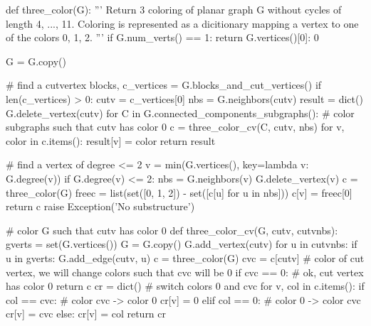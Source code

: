\begin{sageCell}
    def three_color(G):
    '''
    Return 3 coloring of planar graph G without cycles of length 4, ..., 11.
    Coloring is represented as a dicitionary mapping a vertex to one of the colors 0, 1, 2.
    '''
    if G.num_verts() == 1:
        return {G.vertices()[0]: 0}

    G = G.copy()

    # find a cutvertex
    blocks, c_vertices = G.blocks_and_cut_vertices()
    if len(c_vertices) > 0:
        cutv = c_vertices[0]
        nbs = G.neighbors(cutv)
        result = dict()
        G.delete_vertex(cutv)
        for C in G.connected_components_subgraphs():
            # color subgraphs such that cutv has color 0
            c = three_color_cv(C, cutv, nbs)
            for v, color in c.items():
                result[v] = color
        return result

    # find a vertex of degree <= 2
    v = min(G.vertices(), key=lambda v: G.degree(v))
    if G.degree(v) <= 2:
        nbs = G.neighbors(v)
        G.delete_vertex(v)
        c = three_color(G)
        freec = list(set([0, 1, 2]) - set([c[u] for u in nbs]))
        c[v] = freec[0]
        return c
    raise Exception('No substructure')

# color G such that cutv has color 0
def three_color_cv(G, cutv, cutvnbs):
    gverts = set(G.vertices())
    G = G.copy()
    G.add_vertex(cutv)
    for u in cutvnbs:
        if u in gverts:
            G.add_edge(cutv, u)
    c = three_color(G)
    cvc = c[cutv] # color of cut vertex, we will change colors such that cvc will be 0
    if cvc == 0:  # ok, cut vertex has color 0
        return c
    cr = dict()
    # switch colors 0 and cvc
    for v, col in c.items():
        if col == cvc:  # color cvc -> color 0
            cr[v] = 0
        elif col == 0: # color 0 -> color cvc
            cr[v] = cvc
        else:
            cr[v] = col
    return cr
\end{sageCell}

